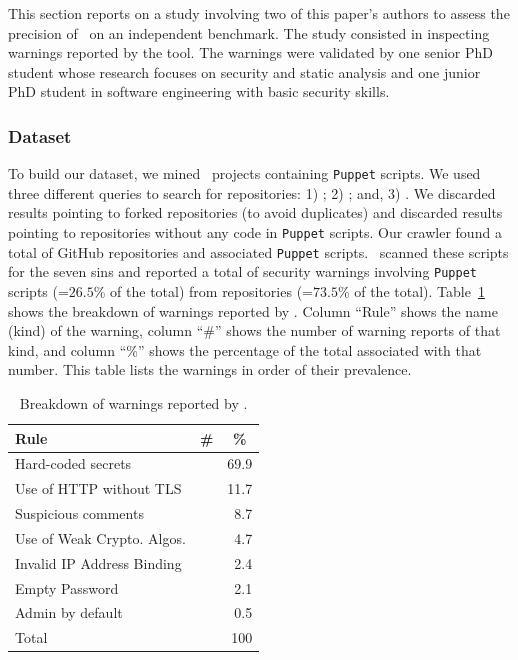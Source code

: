 This section reports on a study involving two of this paper's 
authors to assess the precision of \slic\ on an
independent benchmark. The study consisted in inspecting
\fpSampleSize{} warnings reported by the tool. The warnings
were validated by one senior PhD student whose research focuses 
on security and static analysis and one junior PhD student 
in software engineering with basic security skills. 

\subsubsection{Dataset}\label{subsec:dataset}

\sloppy
To build our dataset, we mined \github\ projects containing \texttt{Puppet} scripts. 
We used three different queries to search for repositories: 1) ; 2) 
; and, 3) . We discarded results pointing 
to forked repositories (to avoid duplicates) and discarded results pointing to repositories without 
any code in \texttt{Puppet} scripts. Our crawler found a total of \totalMinedRepos{} GitHub repositories 
and \totalMinedScripts{} associated \texttt{Puppet} scripts. \slic\ scanned these scripts for the
seven sins and reported a total of \textbf{\minedWarnings} security warnings involving 
\minedScriptsWarnings{} \texttt{Puppet} scripts (=$26.5$\% of the total) from \minedReposWarnings{} 
repositories (=$73.5$\% of the total).
Table~\ref{tab:sins_large} shows the breakdown of warnings reported by \slic. Column ``Rule'' shows the name (kind) of the warning, 
column ``\#'' shows the number of warning reports of that kind, and column ``\%'' 
shows the percentage of the total associated with that number. 
This table lists the warnings in order of their prevalence.

  \begin{table}[t]
    \small
    \centering
    \setlength{\tabcolsep}{10pt}
    \caption{\label{tab:sins_large}Breakdown of warnings reported by \slic{}.}
    \vspace{-2ex}
    \begin{tabular}{lrr}
      \toprule
      Rule & \multicolumn{1}{c}{\#} & \multicolumn{1}{c}{\%}  \\
      \midrule
      Hard-coded secrets & \hardcodedSecretsMined{} & 69.9 \\
      Use of HTTP without TLS & \httpWithoutTLSMined{} & 11.7 \\
      Suspicious comments & \suspiciousCommentsMined{} & 8.7 \\
      Use of Weak Crypto. Algos. & \weakCryptoMined{} & 4.7\\
      Invalid IP Address Binding & \emptyPassMined{} & 2.4\\
      Empty Password & \invalidIPMined{} & 2.1\\
      Admin by default & \adminDefaultMined{} & 0.5 \\
      \midrule
      Total & \minedWarnings{} & 100 \\
      \bottomrule 
    \end{tabular}
    \vspace{-2ex}    
  \end{table}


